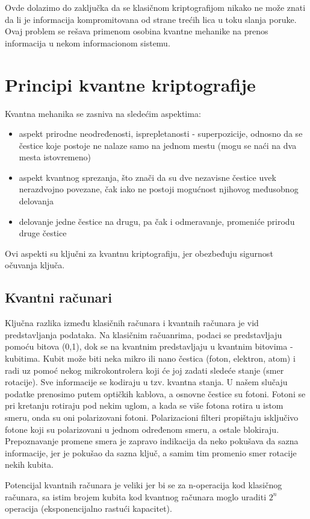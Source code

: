 \documentclass[a4paper]{article}
\begin{document}
{Ovde dolazimo do zaključka da se klasičnom kriptografijom nikako ne može znati da li je informacija kompromitovana od strane trećih lica u toku slanja poruke. Ovaj problem se rešava primenom osobina kvantne mehanike na prenos informacija u nekom informacionom sistemu.

\section{Principi kvantne kriptografije}
Kvantna mehanika se zasniva na sledećim aspektima:
\begin{itemize}
\item aspekt prirodne neodređenosti, isprepletanosti - superpozicije, odnosno da se čestice koje postoje ne nalaze samo na jednom mestu (mogu se naći na dva mesta istovremeno)
\item aspekt kvantnog sprezanja, što znači da su dve nezavisne čestice uvek nerazdvojno povezane, čak iako ne postoji mogućnost njihovog međusobnog delovanja
\item delovanje jedne čestice na drugu, pa čak i odmeravanje, promeniće prirodu druge čestice
\end{itemize}
Ovi aspekti su ključni za kvantnu kriptografiju, jer obezbeđuju sigurnost očuvanja ključa.
\subsection{Kvantni računari}
Ključna razlika između klasičnih računara i kvantnih računara je vid predstavljanja podataka. Na klasičnim račuanrima, podaci se predstavljaju pomoću bitova (0,1), dok se na kvantnim predstavljaju u kvantnim bitovima - kubitima. Kubit može biti neka mikro ili nano čestica (foton, elektron, atom) i radi uz pomoć nekog mikrokontrolera koji će joj zadati sledeće stanje (smer rotacije). Sve informacije se kodiraju u tzv. kvantna stanja. U našem slučaju podatke prenosimo putem optičkih kablova, a osnovne čestice su fotoni. Fotoni se pri kretanju rotiraju pod nekim uglom, a kada se više fotona rotira u istom smeru, onda su oni polarizovani fotoni. Polarizacioni filteri propištaju isključivo fotone koji su polarizovani u jednom određenom smeru, a ostale blokiraju. Prepoznavanje promene smera je zapravo indikacija da neko pokušava da sazna informacije, jer je pokušao da sazna ključ, a samim tim promenio smer rotacije nekih kubita.


Potencijal kvantnih računara je veliki jer bi se za n-operacija kod klasičnog računara, sa istim brojem kubita kod kvantnog računara moglo uraditi $ 2^{n} $ operacija (eksponencijalno rastući kapacitet). 
}
\end{document}
